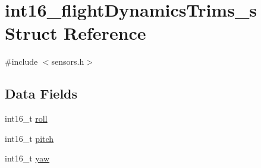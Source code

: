 \hypertarget{structint16__flightDynamicsTrims__s}{\section{int16\+\_\+flight\+Dynamics\+Trims\+\_\+s Struct Reference}
\label{structint16__flightDynamicsTrims__s}
}


{\ttfamily \#include $<$sensors.\+h$>$}

\subsection*{Data Fields}
\begin{DoxyCompactItemize}
\item 
int16\+\_\+t \hyperlink{structint16__flightDynamicsTrims__s_ad9e62797feac16e45551ed4cab710dcc}{roll}
\item 
int16\+\_\+t \hyperlink{structint16__flightDynamicsTrims__s_a3e8f2f4c583dcaa56197fea5d773362b}{pitch}
\item 
int16\+\_\+t \hyperlink{structint16__flightDynamicsTrims__s_a28ee0803d216eddd967a888100e0df02}{yaw}
\end{DoxyCompactItemize}


